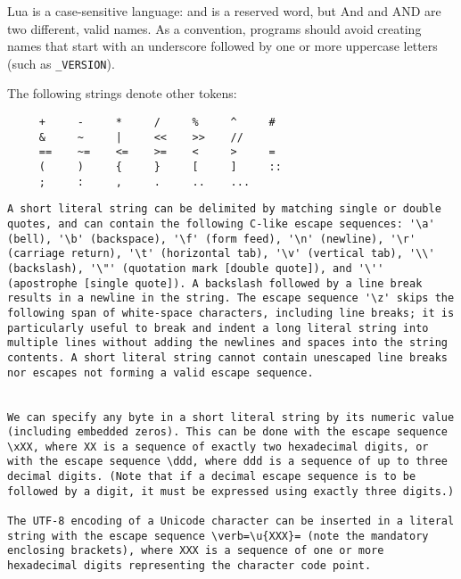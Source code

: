 \begin{itemize}
Lua is a case-sensitive language: and is a reserved word, but And and AND are two different, valid names. As a convention, programs should avoid creating names that start with an underscore followed by one or more uppercase letters (such as \verb=_VERSION=).

The following strings denote other tokens:
\begin{lstlisting}
     +     -     *     /     %     ^     #
     &     ~     |     <<    >>    //
     ==    ~=    <=    >=    <     >     =
     (     )     {     }     [     ]     ::
     ;     :     ,     .     ..    ...
\end{lstlisting}

\begin{verbatim}
A short literal string can be delimited by matching single or double quotes, and can contain the following C-like escape sequences: '\a' (bell), '\b' (backspace), '\f' (form feed), '\n' (newline), '\r' (carriage return), '\t' (horizontal tab), '\v' (vertical tab), '\\' (backslash), '\"' (quotation mark [double quote]), and '\'' (apostrophe [single quote]). A backslash followed by a line break results in a newline in the string. The escape sequence '\z' skips the following span of white-space characters, including line breaks; it is particularly useful to break and indent a long literal string into multiple lines without adding the newlines and spaces into the string contents. A short literal string cannot contain unescaped line breaks nor escapes not forming a valid escape sequence.


We can specify any byte in a short literal string by its numeric value (including embedded zeros). This can be done with the escape sequence \xXX, where XX is a sequence of exactly two hexadecimal digits, or with the escape sequence \ddd, where ddd is a sequence of up to three decimal digits. (Note that if a decimal escape sequence is to be followed by a digit, it must be expressed using exactly three digits.)

The UTF-8 encoding of a Unicode character can be inserted in a literal string with the escape sequence \verb=\u{XXX}= (note the mandatory enclosing brackets), where XXX is a sequence of one or more hexadecimal digits representing the character code point.


\end{verbatim}
\end{itemize}
